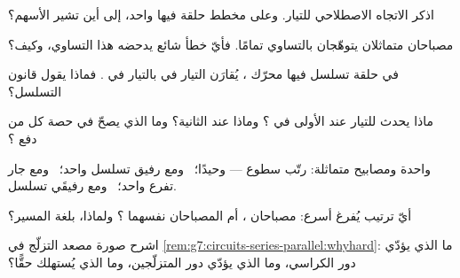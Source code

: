 \begin{exercise}[$\star$]\label{exo:g7:circuits-series-parallel:2}
اذكر الاتجاه الاصطلاحي للتيار. وعلى مخطط حلقة فيها  واحد،
إلى أين تشير الأسهم؟
\end{exercise}

\begin{exercise}[$\star$]\label{exo:g7:circuits-series-parallel:3}
مصباحان متماثلان  يتوهّجان بالتساوي تمامًا. فأيّ
خطأ شائع يدحضه هذا التساوي، وكيف؟
\end{exercise}

\begin{exercise}[$\star$]\label{exo:g7:circuits-series-parallel:4}
في حلقة تسلسل فيها محرّك ، يُقارَن التيار في 
بالتيار في . فماذا يقول قانون التسلسل؟
\end{exercise}

\begin{exercise}[$\star$]\label{exo:g7:circuits-series-parallel:5}
ماذا يحدث للتيار عند  الأولى في ؟ وماذا
عند الثانية؟ وما الذي يصحّ في حصة كل  من دفع ؟
\end{exercise}

\begin{exercise}[$\star$]\label{exo:g7:circuits-series-parallel:6}
 واحدة ومصابيح متماثلة: رتّب سطوع  --- وحيدًا؛
\ ومع رفيق تسلسل واحد؛ \ ومع جار تفرع واحد؛ \ ومع رفيقَي
تسلسل.
\end{exercise}

\begin{exercise}[$\star$]\label{exo:g7:circuits-series-parallel:7}
أيّ ترتيب يُفرغ  أسرع: مصباحان ، أم
المصباحان نفسهما ؟ ولماذا، بلغة المسير؟
\end{exercise}

\begin{exercise}[$\star$]\label{exo:g7:circuits-series-parallel:8}
اشرح صورة مصعد التزلّج في
\cref{rem:g7:circuits-series-parallel:whyhard}: ما الذي يؤدّي
دور الكراسي، وما الذي يؤدّي دور المتزلّجين، وما الذي يُستهلك
حقًّا؟
\end{exercise}

